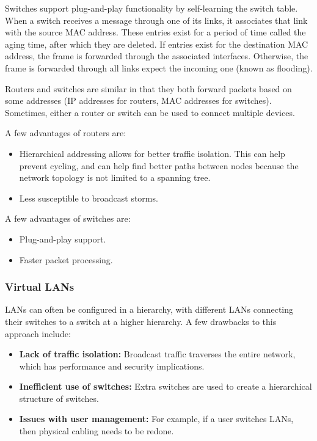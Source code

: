 \documentclass[12pt,titlepage]{article}
\begin{document}
        Switches support plug-and-play functionality by self-learning the switch table. When a switch receives a message through one of its links, it associates that
        link with the source MAC address. These entries exist for a period of time called the aging time, after which they are deleted. If entries exist for the
        destination MAC address, the frame is forwarded through the associated interfaces. Otherwise, the frame is forwarded through all links expect the incoming one
        (known as flooding).

        Routers and switches are similar in that they both forward packets based on some addresses (IP addresses for routers, MAC addresses for switches). Sometimes,
        either a router or switch can be used to connect multiple devices.

        A few advantages of routers are:
        \begin{itemize}
          \item Hierarchical addressing allows for better traffic isolation. This can help prevent cycling, and can help find better paths between nodes because
            the network topology is not limited to a spanning tree.
          \item Less susceptible to broadcast storms.
        \end{itemize}

        A few advantages of switches are:
        \begin{itemize}
          \item Plug-and-play support.
          \item Faster packet processing.
        \end{itemize}

      \subsubsection{Virtual LANs}
        LANs can often be configured in a hierarchy, with different LANs connecting their switches to a switch at a higher hierarchy. A few drawbacks to this
        approach include:
        \begin{itemize}
          \item \textbf{Lack of traffic isolation:} Broadcast traffic traverses the entire network, which has performance and security implications.
          \item \textbf{Inefficient use of switches:} Extra switches are used to create a hierarchical structure of switches.
          \item \textbf{Issues with user management:} For example, if a user switches LANs, then physical cabling needs to be redone.
        \end{itemize}
\end{document}
